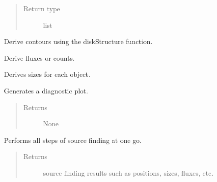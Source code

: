 \documentclass[a4paper,12pt,english]{sphinxmanual}
\begin{document}
\begin{fulllineitems}
\begin{fulllineitems}
\begin{quote}
\begin{description}
\item[{Return type}] \leavevmode
list

\end{description}\end{quote}

\end{fulllineitems}


\begin{fulllineitems}
Derive contours using the diskStructure function.

\end{fulllineitems}


\begin{fulllineitems}
Derive fluxes or counts.

\end{fulllineitems}


\begin{fulllineitems}
Derives sizes for each object.

\end{fulllineitems}


\begin{fulllineitems}
Generates a diagnostic plot.
\begin{quote}\begin{description}
\item[{Returns}] \leavevmode
None

\end{description}\end{quote}

\end{fulllineitems}


\begin{fulllineitems}
Performs all steps of source finding at one go.
\begin{quote}\begin{description}
\item[{Returns}] \leavevmode
source finding results such as positions, sizes, fluxes, etc.


\end{description}
\end{quote}
\end{fulllineitems}
\end{fulllineitems}
\end{document}
